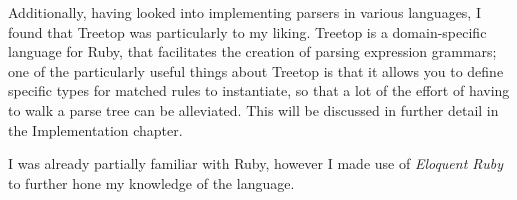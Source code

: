     Additionally, having looked into implementing parsers in various languages,
    I found that Treetop\cite{website:treetop} was particularly to my liking.
    Treetop is a domain-specific language for Ruby, that facilitates the
    creation of parsing expression grammars; one of the particularly useful
    things about Treetop is that it allows you to define specific types for
    matched rules to instantiate, so that a lot of the effort of having to walk
    a parse tree can be alleviated. This will be discussed in further detail in
    the Implementation chapter.

    I was already partially familiar with Ruby, however I made use of
    \emph{Eloquent Ruby}\cite{book:eloquent_ruby} to further hone my knowledge
    of the language.
